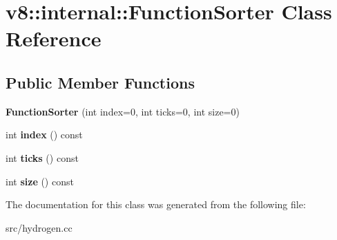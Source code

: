 \hypertarget{classv8_1_1internal_1_1_function_sorter}{}\section{v8\+:\+:internal\+:\+:Function\+Sorter Class Reference}
\label{classv8_1_1internal_1_1_function_sorter}
\subsection*{Public Member Functions}
\begin{DoxyCompactItemize}
\item 
\hypertarget{classv8_1_1internal_1_1_function_sorter_afdc7d5a50d84bc201e4ae336ea784b32}{}{\bfseries Function\+Sorter} (int index=0, int ticks=0, int size=0)\label{classv8_1_1internal_1_1_function_sorter_afdc7d5a50d84bc201e4ae336ea784b32}

\item 
\hypertarget{classv8_1_1internal_1_1_function_sorter_a3f3707866f45a4bdfffa73f1330fe381}{}int {\bfseries index} () const \label{classv8_1_1internal_1_1_function_sorter_a3f3707866f45a4bdfffa73f1330fe381}

\item 
\hypertarget{classv8_1_1internal_1_1_function_sorter_a680d7d90ec3d9c7e82ffa20bb31e3127}{}int {\bfseries ticks} () const \label{classv8_1_1internal_1_1_function_sorter_a680d7d90ec3d9c7e82ffa20bb31e3127}

\item 
\hypertarget{classv8_1_1internal_1_1_function_sorter_a2b10c04d4ae0c5f007907aa9ed5ed05b}{}int {\bfseries size} () const \label{classv8_1_1internal_1_1_function_sorter_a2b10c04d4ae0c5f007907aa9ed5ed05b}

\end{DoxyCompactItemize}


The documentation for this class was generated from the following file\+:\begin{DoxyCompactItemize}
\item 
src/hydrogen.\+cc\end{DoxyCompactItemize}
